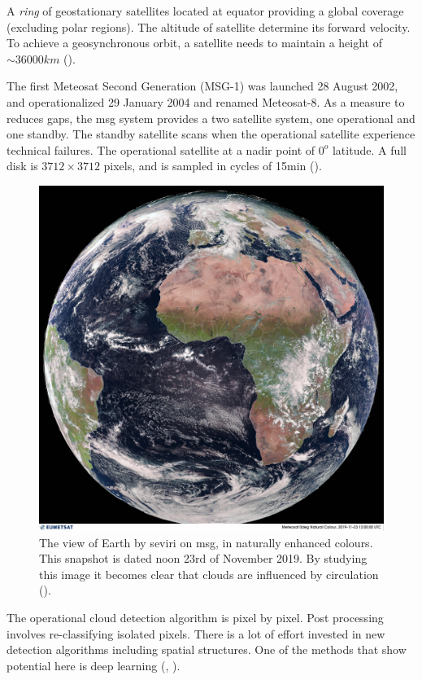A \textit{ring} of geostationary satellites located at equator providing a global coverage (excluding polar regions). The altitude of satellite determine its forward velocity. To achieve a geosynchronous orbit, a satellite needs to maintain a height of $\sim 36 000km$ (\cite{Bley2013ASEVIRI}).  

The first Meteosat Second Generation (MSG-1) was launched 28 August 2002, and operationalized 29 January 2004 and renamed Meteosat-8. As a measure to reduces gaps, the \acrshort{msg} system provides a two satellite system, one operational and one standby. The standby satellite scans when the operational satellite experience technical failures. 
The operational satellite at a nadir point of $0^o$ latitude. A full disk is $3712\times 3712$ pixels, and is sampled in cycles of 15min (\cite{Schmetz_meteosat_intro}).

\begin{figure}[h]
    \centering
    \includegraphics[scale=0.11]{Chapter2_Theory/images/MET10_RGBNatColourEnhncd_FullResolution_20191123120000.jpg}    
    \caption{The view of Earth by \acrshort{seviri} on \acrshort{msg}, in naturally enhanced colours. This snapshot is dated noon 23rd of November 2019. By studying this image it becomes clear that clouds are influenced by circulation  (\cite{eumetcast_image_gallery}).}
    \label{fig:sat_view}
\end{figure}
The operational cloud detection algorithm is pixel by pixel. Post processing involves re-classifying isolated pixels. There is a lot of effort invested in new detection algorithms including spatial structures. One of the methods that show potential here is deep learning (\cite{Dronner2018FastNetworks}, \cite{jeppesen_deep_cloud_masking}).

